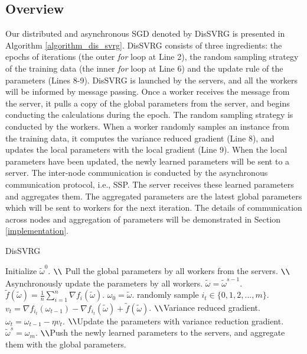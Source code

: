 \documentclass[preprint,review,11pt,a4paper]{elsarticle}
\begin{document}
\subsection{Overview}
Our distributed and asynchronous SGD denoted by DisSVRG is presented  in Algorithm \ref{algorithm_dis_svrg}. DisSVRG consists of three ingredients: the epochs of iterations (the outer \emph{for} loop at Line 2), the random sampling strategy of the training data (the inner \emph{for} loop at Line 6) and the update rule of the parameters (Lines 8-9). DisSVRG is launched by the servers, and all the workers will be informed by message passing. Once a worker receives the message from the server, it pulls a copy of the global parameters from the server, and  begins conducting the calculations during the epoch. The random sampling strategy is conducted by the workers. When a worker randomly samples an instance from the training data, it computes the variance reduced gradient (Line 8), and updates the local parameters with the local gradient (Line 9). When the local parameters have been updated, the newly learned parameters will be sent to a server. The inter-node communication is conducted by the asynchronous communication protocol, i.e., SSP. The server receives these learned parameters  and aggregates them. The aggregated parameters are the latest global parameters which will be sent to workers for the next iteration. The details of communication across nodes and aggregation of parameters will be demonstrated in Section \ref{implementation}.

\begin{algorithm}[t]
    \caption{DisSVRG}
    \label{algorithm_dis_svrg}
    \begin{algorithmic}[1]
        \State Initialize $\tilde{\omega}^0$. $ \verb|\\|$ Pull the global parameters by all workers from the servers.
         $ \verb|\\|$ Asynchronously update the parameters by all workers.
            \State $\tilde{\omega}=\tilde{\omega}^{s-1}$.
            \State $\tilde{f}(\tilde{\omega})=\frac{1}{n}\sum\limits_{i=1}^n\nabla f_i(\tilde{\omega})$.
            \State $\omega_0=\tilde{\omega}$.
                \State randomly sample $i_t\in\{0,1,2,...,m\}$.
                \State $v_t=\nabla f_{i_t}(\omega_{t-1})-\nabla f_{i_t}(\tilde{\omega})+\tilde{f}(\tilde{\omega})$. $ \verb|\\|$Variance reduced gradient.
                \State $\omega_t=\omega_{t-1}-\eta v_t$. $ \verb|\\|$Update the parameters with variance reduction gradient.
           \EndFor
           \State $\tilde{\omega}^s=\omega_m$. $ \verb|\\|$Push the newly learned parameters to the servers, and aggregate them with the global parameters.
       \EndFor
    \end{algorithmic}
\end{algorithm}
\end{document}

